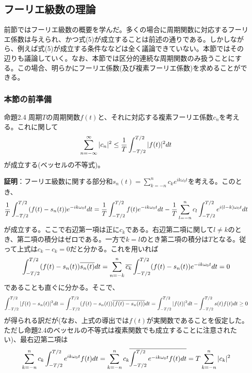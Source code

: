 \documentclass[dvipdfmx, 9pt, a4paper]{jsarticle}
\begin{document}
\subsection{フーリエ級数の理論}
前節ではフーリエ級数の概要を学んだ。多くの場合に周期関数に対応するフーリエ係数は与えられ、かつ式(5)が成立することは前述の通りである。しかしながら、例えば式(5)が成立する条件ななどは全く議論できていない。本節ではその辺りも議論していく。なお、本節では区分的連続な周期関数のみ扱うことにする。この場合、明らかにフーリエ係数(及び複素フーリエ係数)を求めることができる。

\subsubsection{本節の前準備}
\begin{itembox}[l]{命題2.4}
周期$T$の周期関数$f(t)$と、それに対応する複素フーリエ係数$c_n$を考える。これに関して
\begin{equation}
\sum_{n=-\infty}^\infty |c_n|^2 \leq \frac{1}{T}\int_{-T/2}^{T/2}|f(t)|^2dt \notag
\end{equation}
が成立する(ベッセルの不等式)。
\end{itembox}
{\bf 証明}：フーリエ級数に関する部分和$s_n(t)=\sum_{k=-n}^nc_ke^{ik\omega_0t}$を考える。このとき、
\begin{equation}
\frac{1}{T}\int_{-T/2}^{T/2}(f(t)-s_n(t))e^{-ik\omega_0t}dt=\frac{1}{T}\int_{-T/2}^{T/2}f(t)e^{-ik\omega_0t}dt-\frac{1}{T}\sum_{l=-n}^nc_l\int_{-T/2}^{T/2}e^{i(l-k)\omega_0t}dt \notag
\end{equation}
が成立する。ここで右辺第一項は正に$c_k$である。右辺第二項に関して$l\neq k$のとき、第二項の積分はゼロである。一方で$k=l$のとき第二項の積分は$T$となる。従って上式は$c_k-c_k=0$だと分かる。これを用いれば
\begin{equation}
\int_{-T/2}^{T/2}(f(t)-s_n(t))\overline{s_n(t)}dt=\sum_{n=-k}^n\overline{c_k}\int_{-T/2}^{T/2}(f(t)-s_n(t))e^{-ik\omega_0t}dt=0 \notag
\end{equation}
であることも直ぐに分かる。そこで、
\begin{equation}
\int_{-T/2}^{T/2}|f(t)-s_n(t)|^2dt=\int_{-T/2}^{T/2}(f(t)-s_n(t))\overline{(f(t)-s_n(t))}dt=\int_{-T/2}^{T/2}|f(t)|^2dt-\int_{-T/2}^{T/2}s(t)f(t)dt \geq 0 \notag
\end{equation}
が得られる訳だが(なお、上式の導出では$f(t)$が実関数であることを仮定した。ただし命題2.4のベッセルの不等式は複素関数でも成立することに注意されたい)、最右辺第二項は
\begin{equation}
\sum_{k=-n}^nc_k\int_{-T/2}^{T/2}e^{ik\omega_0t}f(t)dt=\sum_{k=-n}^nc_k\overline{\int_{-T/2}^{T/2}e^{-ik\omega_0t}f(t)dt}=T\sum_{k=-n}^n|c_k|^2 \notag
\end{equation}
\end{document}
